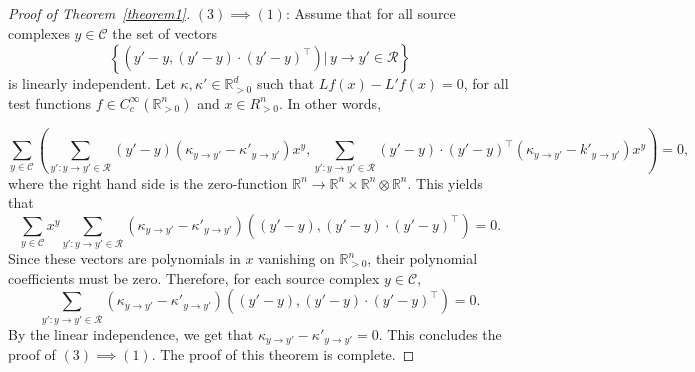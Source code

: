 \documentclass[10pt,a4paper]{amsart}
\theoremstyle{definition}
\theoremstyle{remark}
\theoremstyle{consequence}
\def\k{\kappa}
\def\cR{\mathcal{R}}
\def\cC{\mathcal{C}}
\def\R{\mathbb{R}}
\numberwithin{equation}{section}
\begin{document}
\begin{proof}[Proof of Theorem~\ref{theorem1}]
$(3) \implies (1)$: 
 Assume that for all source complexes $y \in \cC$ the set of vectors 
$$\left\{\left(y' - y,(y' - y)\cdot (y' - y)^{\intercal}\right) \big| \, y\to y'\in\cR \right\}$$
is linearly independent. Let $\k,\k'\in\R^d_{>0}$ such that $L f(x) - L' f(x) = 0$, for all test functions $f\in C^{\infty}_c(\R_{> 0}^n)$ and $x \in R_{> 0}^n$. In other words,

$$\sum_{y \in \cC} \left(\sum_{y' \colon y\to y'\in \cR}(y' - y)(\k_{y\to y'} - \k'_{y\to y'})x^y,\sum_{y' \colon y\to y'\in \cR}(y' - y)\cdot(y' - y)^{\intercal}(\k_{y\to y'}-k'_{y\to y'})x^y \right)= 0,$$
where the right hand side is the zero-function $\R^n\to \R^{n}\times\R^n \otimes \R^n$. This yields that
$$\sum_{y\in \cC}x^y\sum_{y' \colon  y\to y'\in \cR} (\k_{y\to y'}-\k'_{y\to y'}) \left((y' - y),(y' - y)\cdot(y' - y)^{\intercal}\right)= 0.$$
Since these vectors are polynomials in $x$ vanishing on $\R^n_{>0}$, their polynomial coefficients must be zero. Therefore, for each source complex $y\in\cC$,
$$
\sum_{y' \colon y\to y'\in \cR}(\k_{y\to y'}-\k'_{y\to y'}) \left((y' - y),(y' - y)\cdot(y' - y)^{\intercal}\right)= 0 .
$$
By the linear independence, we get that $\k_{y\to y'}-\k'_{y\to y'}=0$. This concludes the proof of $(3) \implies (1)$. The proof of this theorem is complete.
\end{proof}
\end{document}
